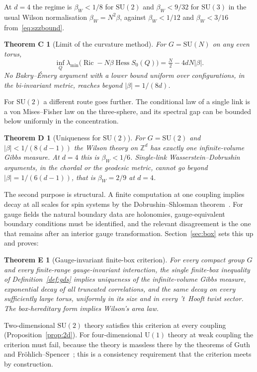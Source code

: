 \documentclass[11pt]{amsart}
\newtheorem*{theoremC}{Theorem C}
\newtheorem*{theoremD}{Theorem D}
\newtheorem*{theoremE}{Theorem E}
\theoremstyle{definition}
\theoremstyle{remark}
\newcommand{\Z}{\mathbb{Z}}
\newcommand{\SU}{\mathrm{SU}}
\newcommand{\U}{\mathrm{U}}
\newcommand{\Hess}{\operatorname{Hess}}
\newcommand{\Ric}{\operatorname{Ric}}
\begin{document}
At $d=4$ the regime is $\beta_W<1/8$ for $\SU(2)$ and $\beta_W<9/32$ for
$\SU(3)$ in the usual Wilson normalisation $\beta_W=N^2\beta$, against
$\beta_W<1/12$ and $\beta_W<3/16$ from~\eqref{eq:szzbound}.

\begin{theoremC}[Limit of the curvature method]
For $G=\SU(N)$ on any even torus,
\[
\inf_Q\lambda_{\min}\bigl(\Ric-N\beta\Hess S_0(Q)\bigr)=\tfrac N2-4dN|\beta| .
\]
No Bakry--\'Emery argument with a lower bound uniform over configurations, in
the bi-invariant metric, reaches beyond $|\beta|=1/(8d)$.
\end{theoremC}

For $\SU(2)$ a different route goes further. The conditional law of a single
link is a von Mises--Fisher law on the three-sphere, and its spectral gap can
be bounded below uniformly in the concentration.

\begin{theoremD}[Uniqueness for $\SU(2)$]
For $G=\SU(2)$ and $|\beta|<1/(8(d-1))$ the Wilson theory on $\Z^d$ has
exactly one infinite-volume Gibbs measure. At $d=4$ this is $\beta_W<1/6$.
Single-link Wasserstein--Dobrushin arguments, in the chordal or the geodesic
metric, cannot go beyond $|\beta|=1/(6(d-1))$, that is $\beta_W=2/9$ at $d=4$.
\end{theoremD}

The second purpose is structural. A finite computation at one coupling
implies decay at all scales for spin systems by the Dobrushin--Shlosman
theorem~\cite{DS85}. For gauge fields the natural boundary data are holonomies,
gauge-equivalent boundary conditions must be identified, and the relevant
disagreement is the one that remains after an interior gauge transformation.
Section~\ref{sec:box} sets this up and proves:

\begin{theoremE}[Gauge-invariant finite-box criterion]
For every compact group $G$ and every finite-range gauge-invariant interaction,
the single finite-box inequality of Definition~\ref{def:gds} implies
uniqueness of the infinite-volume Gibbs measure, exponential decay of all
truncated correlations, and the same decay on every sufficiently large torus,
uniformly in its size and in every 't~Hooft twist sector. The box-hereditary
form implies Wilson's area law.
\end{theoremE}

Two-dimensional $\SU(2)$ theory satisfies this criterion at every coupling
(Proposition~\ref{prop:2d}). For four-dimensional $\U(1)$ theory at weak
coupling the criterion must fail, because the theory is massless there by the
theorems of Guth~\cite{Gut80} and Fr\"ohlich--Spencer~\cite{FS82}; this is a
consistency requirement that the criterion meets by construction.
\end{document}
